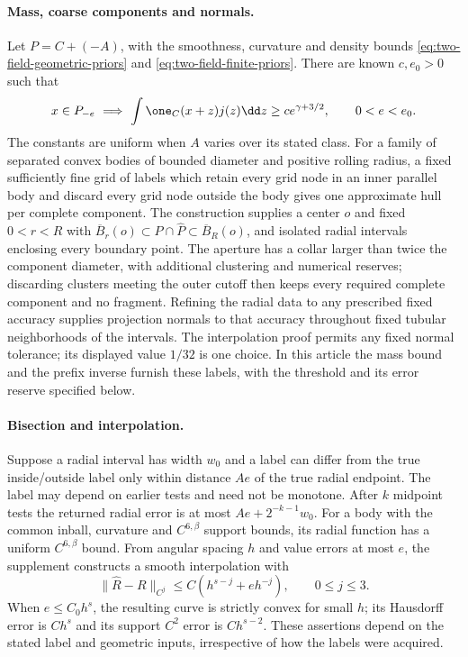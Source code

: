 \paragraph{Mass, coarse components and normals.}
Let $P=C+(-A)$, with the smoothness, curvature and density bounds
\eqref{eq:two-field-geometric-priors} and
\eqref{eq:two-field-finite-priors}. There are known $c,e_0>0$ such that
\[
 x\in P_{-e}\ \Longrightarrow\
 \int\one_C(x+z)j(z)\dd z\ge c e^{\gamma+3/2},
 \qquad 0<e<e_0.
\]
The constants are uniform when $A$ varies over its stated class.
For a family of separated convex bodies of bounded diameter and
positive rolling radius, a fixed sufficiently fine grid of labels
which retain every grid node in an inner parallel body and discard every
grid node outside the body gives one approximate hull per complete
component. The construction supplies a center $o$ and fixed
$0<r<R$ with
$\overline B_r(o)\subset P\cap\widehat P\subset\overline B_R(o)$,
and isolated radial intervals enclosing every boundary point.
The aperture has a collar larger than twice the component diameter,
with additional clustering and numerical reserves; discarding clusters meeting the outer cutoff then
keeps every required complete component and no fragment. Refining the
radial data to any prescribed fixed accuracy supplies projection
normals to that accuracy throughout fixed tubular neighborhoods of
the intervals. The interpolation proof permits any fixed normal
tolerance; its displayed value $1/32$ is one choice.
In this article the mass bound and the prefix inverse furnish these
labels, with the threshold and its error reserve specified below.

\paragraph{Bisection and interpolation.}
Suppose a radial interval has width $w_0$ and a label can differ from
the true inside/outside label only within distance $Ae$ of the true
radial endpoint. The label may depend on earlier tests and need not
be monotone. After $k$ midpoint tests the returned radial error is
at most $Ae+2^{-k-1}w_0$. For a body with the common inball,
curvature and $C^{6,\beta}$ support bounds, its radial function has
a uniform $C^{6,\beta}$ bound. From angular spacing $h$ and value
errors at most $e$, the supplement constructs a smooth interpolation
with
\[
 \|\widehat R-R\|_{C^j}\le C(h^{s-j}+eh^{-j}),
 \qquad 0\le j\le3.
\]
When $e\le C_0h^s$, the resulting curve is strictly convex for small
$h$; its Hausdorff error is $Ch^s$ and its support $C^2$ error is
$Ch^{s-2}$. These assertions depend on the stated label and geometric
inputs, irrespective of how the labels were acquired.

